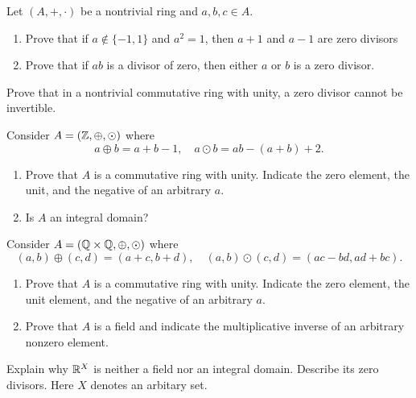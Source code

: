 \documentclass[
    11pt,a4paper,
]{exam}
\begin{document}
\begin{questions}
\question
Let $(A,+,\cdot)$ be a nontrivial ring and $a,b,c\in A$.
\begin{enumerate}
\item Prove that if $a\notin \{-1,1\}$ and $a^2=1$, then $a+1$ and $a-1$ are zero divisors
\item Prove that if $ab$ is a divisor of zero, then either $a$ or $b$ is a zero divisor.
\end{enumerate}


\question
Prove that in a nontrivial commutative ring with unity, a zero divisor cannot be invertible. 




\question
Consider $A = (\mathbb{Z}, \oplus, \odot)$ where
$$
a\oplus b = a+b-1,
\quad
a\odot b = ab - (a+b) +2.
$$
\begin{enumerate}
\item Prove that $A$ is a commutative ring with unity. Indicate the zero element, the unit, and the negative of an arbitrary $a$.
\item Is $A$ an integral domain?
\end{enumerate}


\question
Consider $A = (\mathbb{Q} \times \mathbb{Q}, \oplus, \odot)$ where
$$
(a,b)\oplus (c,d) = (a+c,b+d),
\quad
(a,b)\odot (c,d) = (ac-bd,ad+bc).
$$
\begin{enumerate}[label=(\roman*)]
\item Prove that $A$ is a commutative ring with unity. Indicate the zero element, the unit element, and the negative of an arbitrary $a$.
\item Prove that $A$ is a field and indicate the multiplicative inverse of an arbitrary nonzero element.
\end{enumerate}




\question
Explain why $\mathbb{R}^X$ is neither a field nor an integral domain.
Describe its  zero divisors.
Here \(X\) denotes an arbitary set.



%


\end{questions}
\end{document}
